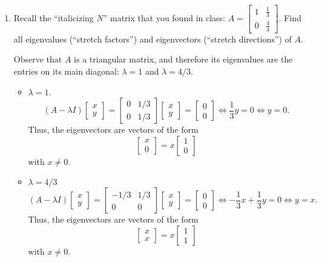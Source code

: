 \documentclass[letter]{article}
\newcommand{\mat}[1]{\begin{bmatrix}#1\end{bmatrix}}
\newenvironment{answer}{
	\begin{adjustwidth}{8mm}{} \vspace{2mm}}{\end{adjustwidth} \vspace{2mm}
}
\theoremstyle{plain}
\theoremstyle{definition}
\theoremstyle{remark}
\begin{document}
\begin{enumerate}
		\item Recall the ``italicizing $N$'' matrix that you found in class: $A = \mat{1 & \frac{1}{3} \\ 0 & \frac{4}{3}}$.
		Find all eigenvalues (``stretch factors'') and eigenvectors (``stretch directions'') of $A$.
		\begin{answer}
			Observe that $A$ is a triangular matrix, and therefore its eigenvalues are the entries on its main diagonal: $\lambda = 1$ and $\lambda = 4/3$. 
			\begin{itemize}
				\item $\lambda = 1$. 
				\[
				(A - \lambda I) \mat{x\\y} = \mat{0 & 1/3 \\ 0 & 1/3}\mat{x\\y} = \mat{0\\0} \iff \frac{1}{3}y = 0 \iff y=0.
				\]
				Thus, the eigenvectors are vectors of the form 
				\[
				\mat{x\\0} = x\mat{1\\0}
				\]
				with $x \neq 0$. 
				\item $\lambda = 4/3$
				\[
				(A - \lambda I) \mat{x\\y} = \mat{-1/3 & 1/3 \\ 0 & 0}\mat{x\\y} = \mat{0\\0} \iff -\frac{1}{3} x + \frac{1}{3} y = 0 \iff y = x.
				\]
				Thus, the eigenvectors are vectors of the form
				\[
				\mat{x\\x} = x\mat{1\\1}
				\]
				with $x \neq 0$. 
			\end{itemize}
		\end{answer}
		
			
		
		
			
		
	\end{enumerate}
\end{document}
